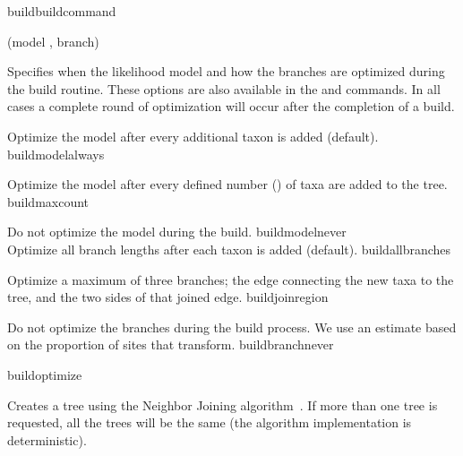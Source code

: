 \begin{command}{build}{buildcommand}
\begin{arguments}
          {(model \optional {\poylident}, branch\optional {\poylident})}
            {Specifies when the likelihood model and how the branches are optimized during
            the build routine. These options are also available in the  and 
             commands. In all cases a complete round 
            of optimization will occur after the completion of a build.

            \begin{description}

                    {Optimize the model after every additional taxon is added (default).}
                    {buildmodelalways}
                    
                    {Optimize the model after every defined number (\poyint) of taxa are added to the tree.}
                    {buildmaxcount}
                    
                    {Do not optimize the model during the build.}
                    {buildmodelnever}
\\
                    {Optimize all branch lengths after each taxon is added (default).}
                    {buildallbranches}

                    {Optimize a maximum of three branches; the edge connecting
                    the new taxa to the tree, and the two sides of that joined
                    edge.}
                    {buildjoinregion}
                    
                    {Do not optimize the branches during the build process. We use
                    an estimate based on the proportion of sites that transform.}
                    {buildbranchnever}

            \end{description}
            }
            {buildoptimize}

            {Creates a tree using the Neighbor Joining algorithm~\cite{saitou1987}. If more than
            one tree is requested, all the trees will be the same (the algorithm
            implementation is deterministic).}{}


\end{arguments}
\end{command}
